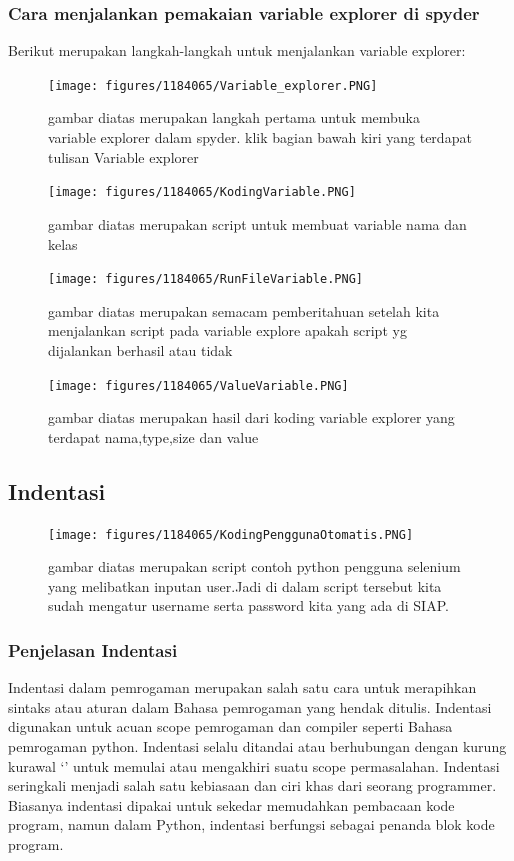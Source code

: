 \subsubsection{Cara menjalankan pemakaian variable explorer di spyder}
 Berikut merupakan langkah-langkah untuk menjalankan variable explorer:
\begin{figure}[H]
		\texttt{[image: figures/1184065/Variable\_explorer.PNG]}
		\centering
		\caption{gambar diatas merupakan langkah pertama untuk membuka variable explorer dalam spyder. klik bagian bawah kiri yang terdapat tulisan Variable explorer }
	\end{figure}
	\begin{figure}[H]
		\texttt{[image: figures/1184065/KodingVariable.PNG]}
		\centering
		\caption{gambar diatas merupakan script untuk membuat variable nama dan kelas}
	\end{figure}
	\begin{figure}[H]
		\texttt{[image: figures/1184065/RunFileVariable.PNG]}
		\centering
		\caption{gambar diatas merupakan semacam pemberitahuan setelah kita menjalankan script pada variable explore apakah script yg dijalankan berhasil atau tidak }
	\end{figure}
	\begin{figure}[H]
		\texttt{[image: figures/1184065/ValueVariable.PNG]}
		\centering
		\caption{gambar diatas merupakan hasil dari koding variable explorer yang terdapat nama,type,size dan value }
	\end{figure}
\subsection{Indentasi}
\begin{figure}[H]
		\texttt{[image: figures/1184065/KodingPenggunaOtomatis.PNG]}
		\centering
		\caption{gambar diatas merupakan script contoh python pengguna selenium yang melibatkan inputan user.Jadi di dalam script tersebut kita sudah mengatur username serta password kita yang ada di SIAP.}
	\end{figure}
\subsubsection{Penjelasan Indentasi}
Indentasi dalam pemrogaman merupakan salah satu cara untuk merapihkan sintaks atau aturan dalam Bahasa pemrogaman yang hendak ditulis. Indentasi digunakan untuk acuan scope pemrogaman dan compiler seperti Bahasa pemrogaman python. Indentasi selalu ditandai atau berhubungan dengan kurung kurawal ‘{}’ untuk memulai atau mengakhiri suatu scope permasalahan. Indentasi seringkali menjadi salah satu kebiasaan dan ciri khas dari seorang programmer. Biasanya indentasi dipakai untuk sekedar memudahkan pembacaan kode program, namun dalam Python, indentasi berfungsi sebagai penanda blok kode program.

